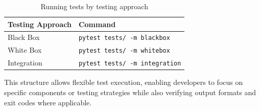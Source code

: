 \begin{table}[H]
    \centering
    \begin{tabular}{|l|l|}
        \hline
        \textbf{Testing Approach} & \textbf{Command} \\
        \hline \hline
        Black Box   & \texttt{pytest tests/ -m blackbox} \\ \hline
        White Box   & \texttt{pytest tests/ -m whitebox} \\ \hline
        Integration & \texttt{pytest tests/ -m integration} \\ \hline
    \end{tabular}
    \caption{Running tests by testing approach}
    \label{tab:test-by-approach}
\end{table}

This structure allows flexible test execution, enabling developers to focus on specific components or testing strategies while also verifying output formats and exit codes where applicable.
